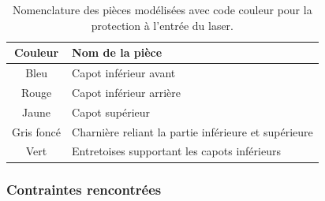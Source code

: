 \begin{minipage}{\textwidth}
    \begin{table}[H]
        \centering
        \begin{tabular}{|c|l|}
            \hline
            \textbf{Couleur}                           & \textbf{Nom de la pièce}                             \\
            \hline
            \textcolor[RGB]{88, 122, 163}{Bleu}        & Capot inférieur avant                                \\
            \textcolor[RGB]{170, 80, 70}{Rouge}        & Capot inférieur arrière                              \\
            \textcolor[RGB]{233, 173, 56}{Jaune}       & Capot supérieur                                      \\
            \textcolor[RGB]{100, 100, 100}{Gris foncé} & Charnière reliant la partie inférieure et supérieure \\
            \textcolor[RGB]{70, 170, 70}{Vert}         & Entretoises supportant les capots inférieurs         \\
            \hline
        \end{tabular}
        \caption{Nomenclature des pièces modélisées avec code couleur pour la protection à l'entrée du laser. \cite{chatgptTableProtectionEntreeLaser}}
        \label{tab:nomenclature_pieces_laser}
    \end{table}
\end{minipage}
\subsubsection{Contraintes rencontrées}


